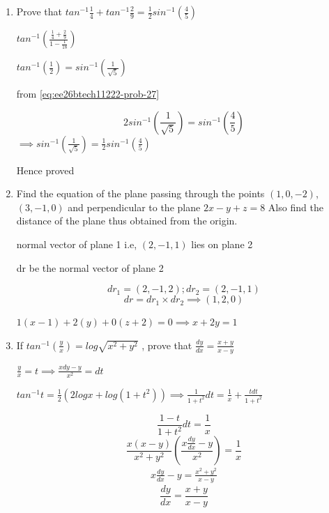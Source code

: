 \begin{enumerate}[label=\thesubsection.\arabic*, ref=\thesubsection.\theenumi]
from \eqref{eq:ee26btech11222-prob 21}
\begin{align}
	I= 2\left(\left(\frac{t^2}{2}tan^{-1}t\right)_0^1-\int _0^1 \frac{t^2}{2(t^2+1)}dt\right)
\end{align}
 $I=2\left(\frac{\pi}{8}-\frac{1}{2}\left[t\right]_0^1 +\frac{1}{2}\left[tan^{-1}t\right]_0^1\right) $

$I =\frac{\pi}{2}-1$

\item 

Prove that $tan^{-1}\frac{1}{4}+tan^{-1}\frac{2}{9}=\frac{1}{2}sin^{-1}(\frac{4}{5})$

\solution


$tan^{-1}\left(\frac{\frac{1}{4} +\frac{2}{9}}{1-\frac{1}{18}}\right)$

$tan^{-1}(\frac{1}{2})=sin^{-1}(\frac{1}{\sqrt{5}})$

from \eqref{eq:ee26btech11222-prob-27}

$$2sin^{-1}(\frac{1}{\sqrt{5}})= sin^{-1}(\frac{4}{5})$$ $\implies sin^{-1}(\frac{1}{\sqrt{5}})=\frac{1}{2}sin^{-1}(\frac{4}{5})$

Hence proved 

\item 

Find the equation of the plane passing through the points $(1,0,-2)$, $(3,-1,0)$ and perpendicular to the plane $2x-y+z=8$ Also find the distance of the plane thus obtained from the origin.  

\solution

normal vector of plane 1 i.e, $(2,-1,1)$ lies on plane 2

dr be the normal vector of plane 2

$$dr_1 = (2,-1,2); dr_2= (2,-1,1)$$  $$dr=dr_1 \times {dr_2 } \implies (1,2,0)$$

$1(x-1) +2(y)+0(z+2) =0 \implies x+2y=1$

\item 

If $tan^{-1}(\frac{y}{x})=log\sqrt{x^{2}+y^{2}}$ , prove that $\frac{dy}{dx}=\frac{x+y}{x-y}$

\solution

$\frac{y}{x}=t \implies \frac{xdy-y}{x^2} =dt$

$tan^{-1}t=\frac{1}{2}(2logx +log(1+t^2)) \implies \frac{1}{1+ t^2}dt= \frac{1}{x}+\frac{tdt}{1+t^2}$

$$\frac{1-t}{1+t^2}dt =\frac{1}{x}$$  $$\frac{x(x-y)}{x^2+y^2}\left(\frac{x\frac{dy}{dx}-y}{x^2}\right)=\frac{1}{x}$$
\begin{align}
	x\frac{dy}{dx}-y=\frac{x^2+y^2}{x-y}
\end{align}
$$\frac{dy}{dx}= \frac{x+y}{x-y}$$


\end{enumerate}
